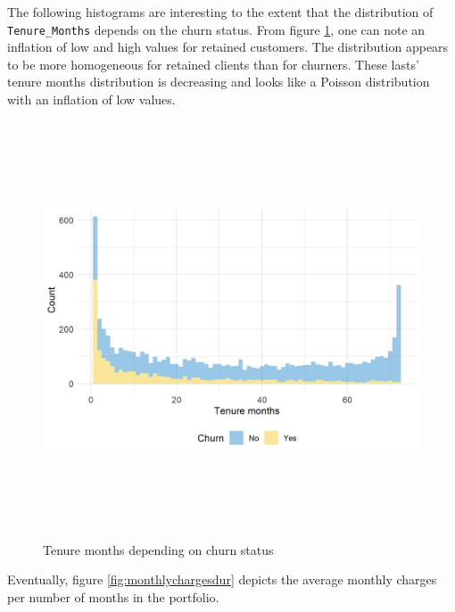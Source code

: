\documentclass[
]{book}
\begin{document}
The following histograms are interesting to the extent that the distribution of \texttt{Tenure\_Months} depends on the churn status. From figure \ref{fig:churndur}, one can note an inflation of low and high values for retained customers. The distribution appears to be more homogeneous for retained clients than for churners. These lasts' tenure months distribution is decreasing and looks like a Poisson distribution with an inflation of low values.

\begin{figure}

{\centering \includegraphics[width=500pt,height=350pt]{./imgs/duration_churn_plot} 

}

\caption{Tenure months depending on churn status}\label{fig:churndur}
\end{figure}

Eventually, figure \ref{fig:monthlychargesdur} depicts the average monthly charges per number of months in the portfolio.
\end{document}
